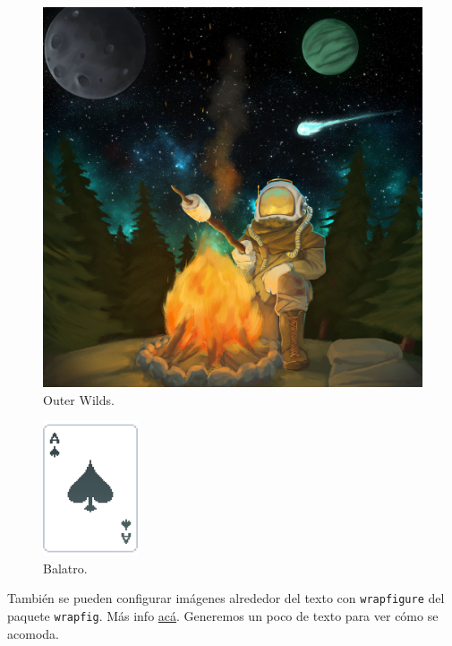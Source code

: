 \documentclass[12pt, spanish]{article}
\theoremstyle{definition} %
\theoremstyle{remark} %
\theoremstyle{plain} %
\theoremstyle{plain} %
\theoremstyle{plain} %
\theoremstyle{plain} %
\theoremstyle{plain} %
\theoremstyle{remark} %
\begin{document}
\begin{figure}[hbt!]
    \begin{center}
        \includegraphics[scale=0.09]{imagenes/outer wilds.jpeg}
        \caption{Outer Wilds.}
        \label{fig:outer wilds}
    \end{center}
\end{figure}

\begin{figure}
  \begin{center}
    \includegraphics[width=0.25\textwidth]{imagenes/balatro.pdf}
  \caption{Balatro.}
  \end{center}
\end{figure}

También se pueden configurar imágenes alrededor del texto con \verb|wrapfigure| del paquete \verb|wrapfig|. Más info \href{https://www.overleaf.com/learn/latex/Wrapping_text_around_figures}{acá}. Generemos un poco de texto para ver cómo se acomoda.
\end{document}
